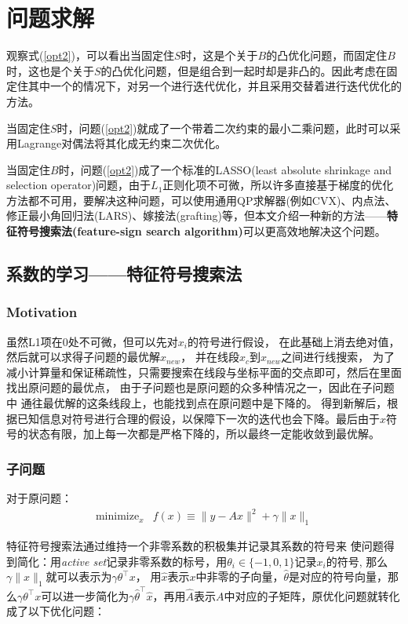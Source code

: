 \section{问题求解}
观察式(\ref{opt2})，可以看出当固定住$S$时，这是个关于$B$的凸优化问题，而固定住$B$时，这也是个关于$S$的凸优化问题，但是组合到一起时却是非凸的。因此考虑在固定住其中一个的情况下，对另一个进行迭代优化，并且采用交替着进行迭代优化的方法。

当固定住$S$时，问题(\ref{opt2})就成了一个带着二次约束的最小二乘问题，此时可以采用Lagrange对偶法将其化成无约束二次优化。

当固定住$B$时，问题(\ref{opt2})成了一个标准的LASSO(least absolute shrinkage and selection operator)问题，由于$L_1$正则化项不可微，所以许多直接基于梯度的优化方法都不可用，要解决这种问题，可以使用通用QP求解器(例如CVX)、内点法、修正最小角回归法(LARS)、嫁接法(grafting)等，但本文介绍一种新的方法——\textbf{特征符号搜索法(feature-sign search algorithm)}可以更高效地解决这个问题。

\subsection{系数的学习——特征符号搜索法}
\subsubsection{Motivation}
虽然L1项在0处不可微，但可以先对$x_i$的符号进行假设，
在此基础上消去绝对值，然后就可以求得子问题的最优解$x_{new}$，
并在线段$x_c$到$x_{new}$之间进行线搜索，
为了减小计算量和保证稀疏性，只需要搜索在线段与坐标平面的交点即可，然后在里面找出原问题的最优点，
由于子问题也是原问题的众多种情况之一，因此在子问题中
通往最优解的这条线段上，也能找到点在原问题中是下降的。
得到新解后，根据已知信息对符号进行合理的假设，以保障下一次的迭代也会下降。最后由于$x$符号的状态有限，加上每一次都是严格下降的，所以最终一定能收敛到最优解。

\subsubsection{子问题}
对于原问题：
\begin{equation}\label{opt3}
\begin{array}{rc}
\text{minimize}_{x} &
f(x)\equiv \|y-Ax\|^2+\gamma\|x\|_1
\end{array}
\end{equation}

特征符号搜索法通过维持一个非零系数的积极集并记录其系数的符号来
使问题得到简化：用\emph{active set}记录非零系数的标号，用$\theta_i\in\{-1,0,1\}$记录$x_i$的符号,
那么$\gamma\|x\|_1$就可以表示为$\gamma\theta^{\top}x$，
用$\hat{x}$表示$x$中非零的子向量，$\hat{\theta}$是对应的符号向量，那么$\gamma\theta^{\top}x$可以进一步简化为$\gamma\hat{\theta}^{\top}\hat{x}$，再用$\hat{A}$表示$A$中对应的子矩阵，原优化问题就转化成了以下优化问题：

